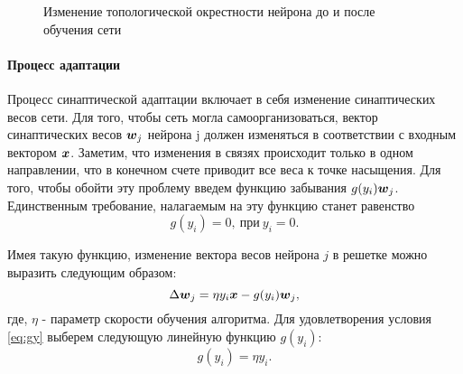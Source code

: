 \documentclass[a4paper,12pt]{report}
\begin{document}
\begin{figure}[!htb]
    \centering
    \caption{Изменение топологической окрестности нейрона до и после
    обучения сети}
    \label{fig:h educ}
\end{figure}

\paragraph{Процесс адаптации}
Процесс синаптической адаптации включает в себя изменение
синаптических весов сети. Для того, чтобы сеть могла
самоорганизоваться, вектор синаптических весов $\boldsymbol{w}_j$ нейрона j
должен изменяться в соответствии с входным вектором $\boldsymbol{x}$.
Заметим, что изменения в связях происходит только в одном направлении,
что в конечном счете приводит все веса к точке насыщения. Для того,
чтобы обойти эту проблему введем функцию забывания $g(y_i)\boldsymbol{w}_j$.
Единственным требование, налагаемым на эту функцию станет равенство
\begin{equation} \label{eq:gy}
    g(y_i) = 0,\ \text{при}\ y_i = 0.
\end{equation}

Имея такую функцию, изменение вектора весов нейрона $j$ в решетке
можно выразить следующим образом:
\begin{equation} \label{eq:delta w 1}
    \Delta\boldsymbol{w}_j = \eta y_i\boldsymbol{x} - g(y_i)\boldsymbol{w}_j,
\end{equation}
где, $\eta$ - параметр скорости обучения алгоритма. Для удовлетворения
условия \eqref{eq:gy} выберем следующую линейную функцию $g(y_i)$:
\begin{equation}
    g(y_i) = \eta y_i.
\end{equation}
\end{document}
